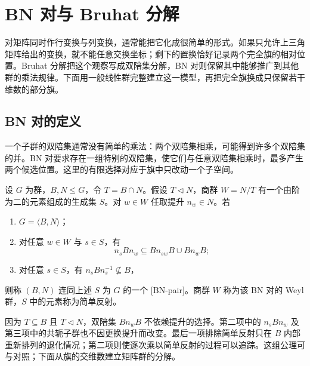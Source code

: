 
\section{BN 对与 Bruhat 分解}
\label{b5:sec:F02}

对矩阵同时作行变换与列变换，通常能把它化成很简单的形式。如果只允许上三角矩阵给出的变换，就不能任意交换坐标；剩下的置换恰好记录两个完全旗的相对位置。Bruhat 分解把这个观察写成双陪集分解，BN 对则保留其中能够推广到其他群的乘法规律。下面用一般线性群完整建立这一模型，再把完全旗换成只保留若干维数的部分旗。

\subsection{BN 对的定义}
\label{b5:subsec:F02:01}

一个子群的双陪集通常没有简单的乘法：两个双陪集相乘，可能得到许多个双陪集的并。BN 对要求存在一组特别的双陪集，使它们与任意双陪集相乘时，最多产生两个候选位置。这里的有限选择对应于旗中只改动一个子空间。

\begin{definition}\label{b5:def:F-BN-pair}
	设 \(G\) 为群，\(B,N\le G\)，令 \(T=B\cap N\)。假设 \(T\triangleleft N\)，商群 \(W=N/T\) 有一个由阶为二的元素组成的生成集 \(S\)。对 \(w\in W\) 任取提升 \(n_w\in N\)。若
	\begin{enumerate}
		\item \(G=\langle B,N\rangle\)；
		\item 对任意 \(w\in W\) 与 \(s\in S\)，有
		\[
			n_sBn_w\subseteq Bn_{sw}B\cup Bn_wB;
		\]
		\item 对任意 \(s\in S\)，有 \(n_sBn_s^{-1}\not\subseteq B\)，
	\end{enumerate}
	则称 \((B,N)\) 连同上述 \(S\) 为 \(G\) 的一个 [BN-pair]。商群 \(W\) 称为该 BN 对的 Weyl 群，\(S\) 中的元素称为简单反射。
\end{definition}

因为 \(T\subseteq B\) 且 \(T\triangleleft N\)，双陪集 \(Bn_wB\) 不依赖提升的选择。第二项中的 \(n_sBn_w\) 及第三项中的共轭子群也不因更换提升而改变。最后一项排除简单反射只在 \(B\) 内部重新排列的退化情况；第二项则使逐次乘以简单反射的过程可以追踪。这组公理可与\cite[Chapter 5, p. 27]{Taylor1992ClassicalGroups}对照；下面从旗的交维数建立矩阵群的分解。

